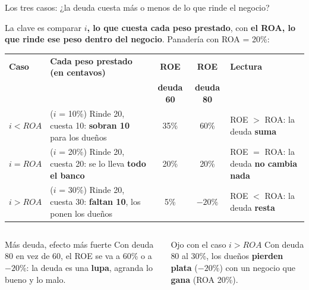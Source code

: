 \documentclass[aspectratio=169,10pt]{beamer}
\begin{document}
\begin{frame}{Los tres casos: ¿la deuda cuesta más o menos de lo que rinde el negocio?}

\small
La clave es comparar \textbf{$i$, lo que cuesta cada peso prestado}, con \textbf{el ROA, lo que rinde
ese peso dentro del negocio}. Panadería con ROA = 20\%:

\begin{center}
\footnotesize
\begin{tabular}{@{}l>{\raggedright\arraybackslash}p{5.2cm}cc>{\raggedright\arraybackslash}p{3.4cm}@{}}
\toprule
\textbf{Caso} & \textbf{Cada peso prestado (en centavos)} & \textbf{ROE} & \textbf{ROE} & \textbf{Lectura} \\
 & & \textbf{deuda 60} & \textbf{deuda 80} & \\
\midrule
$i < ROA$ & ($i$ = 10\%) Rinde 20, cuesta 10: \textbf{sobran 10} para los dueños & 35\% & 60\% & ROE $>$ ROA: la deuda \textbf{suma} \\
\addlinespace
$i = ROA$ & ($i$ = 20\%) Rinde 20, cuesta 20: se lo lleva \textbf{todo el banco} & 20\% & 20\% & ROE $=$ ROA: la deuda \textbf{no cambia nada} \\
\addlinespace
$i > ROA$ & ($i$ = 30\%) Rinde 20, cuesta 30: \textbf{faltan 10}, los ponen los dueños & 5\% & $-20\%$ & ROE $<$ ROA: la deuda \textbf{resta} \\
\bottomrule
\end{tabular}
\end{center}

\begin{columns}[T]
\begin{block}{Más deuda, efecto más fuerte}
Con deuda 80 en vez de 60, el ROE se va a 60\% o a $-20\%$: la deuda es una \textbf{lupa}, agranda
lo bueno y lo malo.
\end{block}

\begin{alertblock}{Ojo con el caso $i > ROA$}
Con deuda 80 al 30\%, los dueños \textbf{pierden plata} ($-20\%$) con un negocio que \textbf{gana} (ROA 20\%).
\end{alertblock}
\end{columns}
\end{frame}
\end{document}
